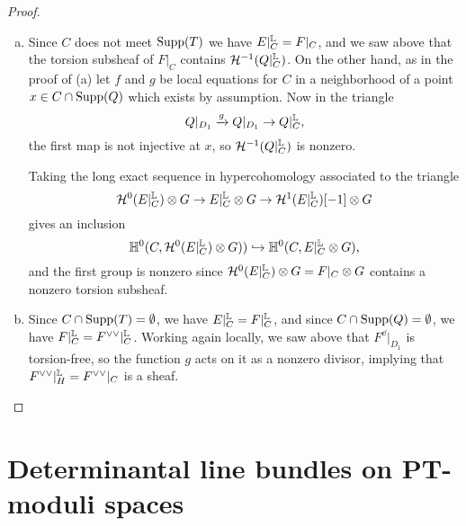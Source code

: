 \begin{proof}
\begin{enumerate}[(a)]
    \item Since $C$ does not meet $\operatorname{\mathrm{Supp}}(T)$ we have $E|^{\mathbb{L}}_C = F|_C$, and we saw above that the torsion subsheaf of $F|_C$ contains $\mathcal{H}^{-1}(Q|^{\mathbb{L}}_C)$. On the other hand, as in the proof of (a) let $f$ and $g$ be local equations for $C$ in a neighborhood of a point $x \in C \cap \operatorname{\mathrm{Supp}}(Q)$ which exists by assumption. Now in the triangle
    \[ Q|_{D_1} \xrightarrow{g} Q|_{D_1} \to Q|^{\mathbb{L}}_C, \]
    the first map is not injective at $x$, so $\mathcal{H}^{-1}(Q|^{\mathbb{L}}_C)$ is nonzero.
    
    Taking the long exact sequence in hypercohomology associated to the triangle
    \[ \mathcal{H}^0(E|^{\mathbb{L}}_C) \otimes G \to E|^{\mathbb{L}}_C \otimes G \to \mathcal{H}^1(E|^{\mathbb{L}}_C)[-1] \otimes G \]
    gives an inclusion 
    \[ \mathbb{H}^0(C, \mathcal{H}^0(E|^{\mathbb{L}}_C) \otimes G)) \hookrightarrow \mathbb{H}^0(C, E|^{\mathbb{L}}_C \otimes G), \]
    and the first group is nonzero since $\mathcal{H}^0(E|^{\mathbb{L}}_C) \otimes G = F|_C \otimes G$ contains a nonzero torsion subsheaf.
    
    \item Since $C \cap \operatorname{\mathrm{Supp}}(T) = \emptyset$, we have $E|^{\mathbb{L}}_C = F|^{\mathbb{L}}_C$, and since $C \cap \operatorname{\mathrm{Supp}}(Q) = \emptyset$, we have $F|^{\mathbb{L}}_C = F^{\vee\vee}|^{\mathbb{L}}_C$. Working again locally, we saw above that $F^\dd|_{D_1}$ is torsion-free, so the function $g$ acts on it as a nonzero divisor, implying that $F^{\vee\vee}|^{\mathbb{L}}_H = F^{\vee\vee}|_C$ is a sheaf.
\end{enumerate}
\end{proof}


\section{Determinantal line bundles on PT-moduli spaces}

